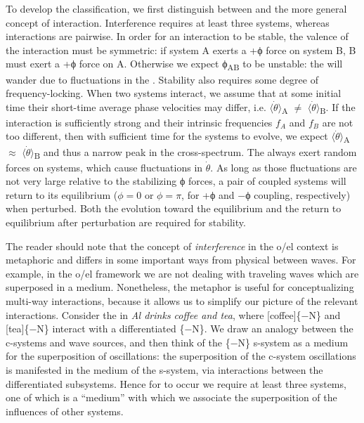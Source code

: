   To develop the classification, we first distinguish between  and the more general concept of interaction. Interference requires at least three systems, whereas interactions are pairwise. In order for an interaction to be stable, the valence of the interaction must be symmetric: if system A exerts a +ϕ force on system B, B must exert a +ϕ force on A. Otherwise we expect ϕ\textsubscript{AB} to be unstable: the  will wander due to fluctuations in the . Stability also requires some degree of frequency-locking. When two systems interact, we assume that at some initial time their short-time average phase velocities may differ, i.e. $\langle\dot{\theta}\rangle$\textsubscript{A} ${\neq}$ $\langle\dot{\theta}\rangle$\textsubscript{B}. If the interaction is sufficiently strong and their intrinsic frequencies $f_A$ and $f_B$ are not too different, then with sufficient time for the systems to evolve, we expect $\langle\dot{\theta}\rangle$\textsubscript{A} ${\approx}$ $\langle\dot{\theta}\rangle$\textsubscript{B} and thus a narrow peak in the cross-spectrum. The  always exert random forces on systems, which cause fluctuations in  $\dot{\theta}$. As long as those fluctuations are not very large relative to the stabilizing ϕ forces, a pair of coupled systems will return to its equilibrium ($ϕ=0$ or $ϕ=π$, for +ϕ and −ϕ coupling, respectively) when perturbed. Both the evolution toward the equilibrium and the return to equilibrium after perturbation are required for stability.

  The reader should note that the concept of \textit{interference} in the o/el context is metaphoric and differs in some important ways from physical  between waves. For example, in the o/el framework we are not dealing with traveling waves which are superposed in a medium. Nonetheless, the metaphor is useful for conceptualizing multi-way interactions, because it allows us to simplify our picture of the relevant interactions. Consider the  in \textit{Al drinks coffee and tea}, where [coffee]\{−N\} and [tea]\{−N\} interact with a differentiated \{−N\}. We draw an analogy between the c-systems and wave sources, and then think of the \{−N\} s-system as a medium for the superposition of oscillations: the superposition of the c-system oscillations is manifested in the medium of the s-system, via interactions between the differentiated subsystems. Hence for  to occur we require at least three systems, one of which is a “medium” with which we associate the superposition of the influences of other systems. 

